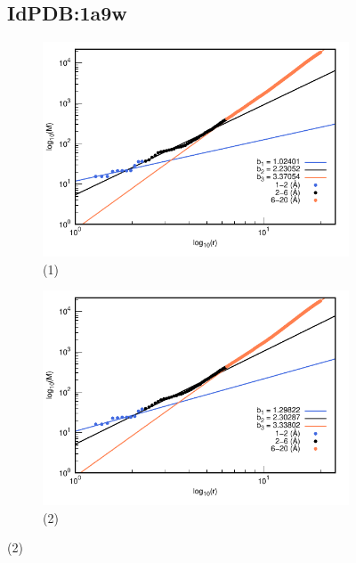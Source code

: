 \begin{figure}[H]
	\subsection*{IdPDB:1a9w}
	
	\hspace{-0.3cm} 
	\begin{subfigure}{0.49\textwidth}
		\centering
		\includegraphics[width=\linewidth,page=1]{graphs/PDBs/1a9w/1a9waddH.pdf}
		\caption{(1)}
	\end{subfigure}
	\hspace{0.2cm}
	\begin{subfigure}{0.49\textwidth}
		\centering
		\includegraphics[width=\linewidth,page=1]{graphs/PDBs/1a9w/1a9wEm.pdf}
		\caption{(2)}
	\end{subfigure}
	

\end{figure}
